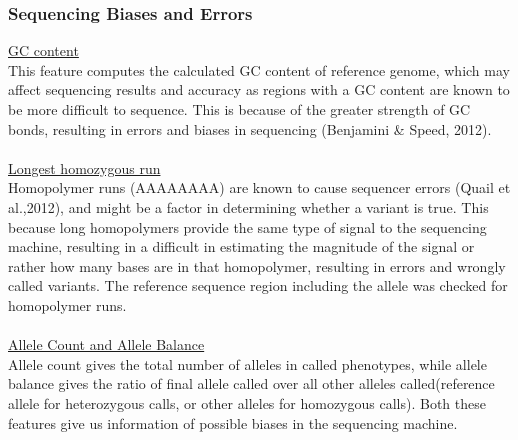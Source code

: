 \documentclass{article}
\begin{document}
\subsubsection{Sequencing Biases and Errors}
\underline{GC content}\\
This feature computes the calculated GC content of reference genome, which may affect sequencing results and accuracy as regions with a GC content are known to be more difficult to sequence. This is because of the greater strength of GC bonds, resulting in errors and biases in sequencing (Benjamini \& Speed, 2012).\\\\ 
\underline{Longest homozygous run}\\
Homopolymer runs (AAAAAAAA) are known to cause sequencer errors (Quail et al.,2012), and might be a factor in determining whether a variant is true. This because long homopolymers provide the same type of signal to the sequencing machine, resulting in a difficult in estimating the magnitude of the signal or rather how many bases are in that homopolymer, resulting in errors and wrongly called variants. The reference sequence region including the allele was checked for homopolymer runs. \\\\
\underline{Allele Count and Allele Balance}\\
Allele count gives the total number of alleles in called phenotypes, while allele balance gives the ratio of final allele called over all other alleles called(reference allele for heterozygous calls, or other alleles for homozygous calls). Both these features give us information of possible biases in the sequencing machine.\\\\
\end{document}

